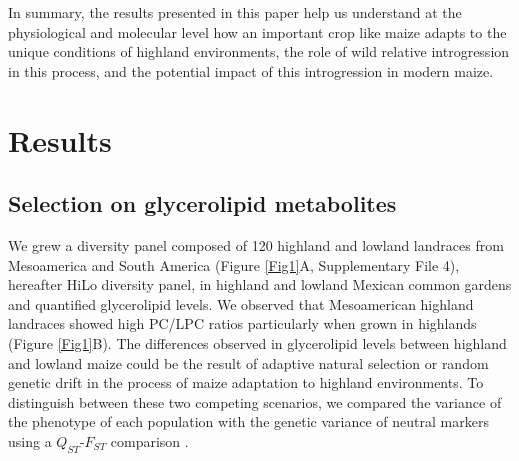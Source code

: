 \documentclass[9pt,twocolumn,twoside,lineno]{BioRxiv}
\begin{document}
In summary, the results presented in this paper help us understand at the physiological and molecular level how an important crop like maize adapts to the unique conditions of highland environments, the role of wild relative introgression in this process, and the potential impact of this introgression in modern maize.

\section{Results}
\label{sec:results}
\subsection{Selection on glycerolipid metabolites}  
We grew a diversity panel composed of 120 highland and lowland landraces from Mesoamerica and South America (Figure \ref{Fig1}A, Supplementary File 4), hereafter HiLo diversity panel, in highland and lowland Mexican common gardens and quantified glycerolipid levels.    
We observed that Mesoamerican highland landraces showed  high PC/LPC ratios  particularly when grown in highlands (Figure \ref{Fig1}B). %
The differences observed in glycerolipid levels between highland and lowland maize could be the result of adaptive natural selection or random genetic drift in the process of maize adaptation to highland environments.
To distinguish between these two competing scenarios, we compared the variance of the phenotype of each population with the genetic variance of neutral markers using a $Q_{ST}$-$F_{ST}$ comparison \cite{Leinonen2013-ic}.
\end{document}
